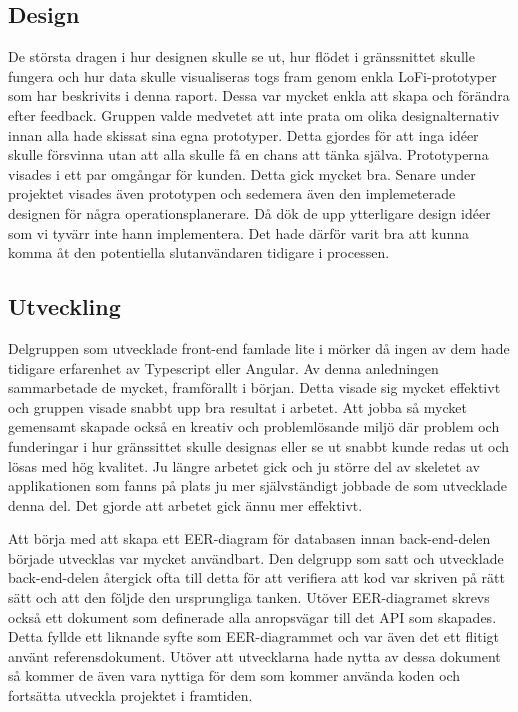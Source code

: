\subsection{Design}
De största dragen i hur designen skulle se ut, hur flödet i gränssnittet skulle fungera och hur data skulle visualiseras togs fram genom enkla LoFi-prototyper som har beskrivits i denna raport. Dessa var mycket enkla att skapa och förändra efter feedback. Gruppen valde medvetet att inte prata om olika designalternativ innan alla hade skissat sina egna prototyper. Detta gjordes för att inga idéer skulle försvinna utan att alla skulle få en chans att tänka själva. Prototyperna visades i ett par omgångar för kunden. Detta gick mycket bra. Senare under projektet visades även prototypen och sedemera även den implemeterade designen för några operationsplanerare. Då dök de upp ytterligare design idéer som vi tyvärr inte hann implementera. Det hade därför varit bra att kunna komma åt den potentiella slutanvändaren tidigare i processen.

\subsection{Utveckling}
Delgruppen som utvecklade front-end famlade lite i mörker då ingen av dem hade tidigare erfarenhet av Typescript eller Angular. Av denna anledningen sammarbetade de mycket, framförallt i början. Detta visade sig mycket effektivt och gruppen visade snabbt upp bra resultat i arbetet. Att jobba så mycket gemensamt skapade också en kreativ och problemlösande miljö där problem och funderingar i hur gränssittet skulle designas eller se ut snabbt kunde redas ut och lösas med hög kvalitet. Ju längre arbetet gick och ju större del av skeletet av applikationen som fanns på plats ju mer självständigt jobbade de som utvecklade denna del. Det gjorde att arbetet gick ännu mer effektivt.

Att börja med att skapa ett EER-diagram för databasen innan back-end-delen började utvecklas var mycket användbart. Den delgrupp som satt och utvecklade back-end-delen återgick ofta till detta för att verifiera att kod var skriven på rätt sätt och att den följde den ursprungliga tanken. Utöver EER-diagramet skrevs också ett dokument som definerade alla anropsvägar till det API som skapades. Detta fyllde ett liknande syfte som EER-diagrammet och var även det ett flitigt använt referensdokument. Utöver att utvecklarna hade nytta av dessa dokument så kommer de även vara nyttiga för dem som kommer använda koden och fortsätta utveckla projektet i framtiden.


